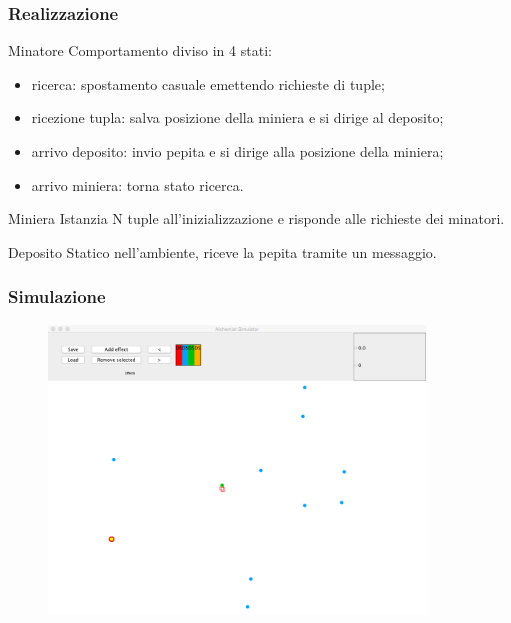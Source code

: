 \documentclass[handout]{beamer}\mode<presentation>{\usetheme{AMSCesenaBleu}}
\begin{document}
\begin{frame}
\frametitle{Realizzazione}
\begin{block}{Minatore}
Comportamento diviso in 4 stati:
\begin{itemize}
\item \alert{ricerca}: spostamento casuale emettendo richieste di tuple;
\item \alert{ricezione tupla}: salva posizione della miniera e si dirige al deposito;
\item \alert{arrivo deposito}: invio pepita e si dirige alla posizione della miniera;
\item \alert{arrivo miniera}: torna stato ricerca. 
\end{itemize}
\end{block}
\begin{block}{Miniera}
Istanzia N tuple all'inizializzazione e risponde alle richieste dei minatori.
\end{block}
\begin{block}{Deposito}
Statico nell'ambiente, riceve la pepita tramite un messaggio.
\end{block}
\end{frame}

\begin{frame}
\frametitle{Simulazione}
\vspace*{-0.25cm}
\begin{figure}
\includegraphics[width=10cm]{images/simul.png}
\end{figure}
\end{frame}
\end{document}
